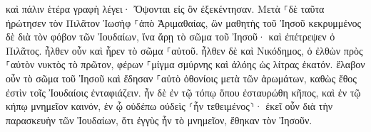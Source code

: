 \documentclass{openreader}
\begin{document}
καὶ πάλιν ἑτέρα γραφὴ λέγει· Ὄψονται εἰς ὃν ἐξεκέντησαν. 
Μετὰ ⸀δὲ ταῦτα ἠρώτησεν τὸν Πιλᾶτον Ἰωσὴφ ⸀ἀπὸ Ἁριμαθαίας, ὢν μαθητὴς τοῦ Ἰησοῦ κεκρυμμένος δὲ διὰ τὸν φόβον τῶν Ἰουδαίων, ἵνα ἄρῃ τὸ σῶμα τοῦ Ἰησοῦ· καὶ ἐπέτρεψεν ὁ Πιλᾶτος. ἦλθεν οὖν καὶ ἦρεν τὸ σῶμα ⸀αὐτοῦ. 
ἦλθεν δὲ καὶ Νικόδημος, ὁ ἐλθὼν πρὸς ⸀αὐτὸν νυκτὸς τὸ πρῶτον, φέρων ⸀μίγμα σμύρνης καὶ ἀλόης ὡς λίτρας ἑκατόν. 
ἔλαβον οὖν τὸ σῶμα τοῦ Ἰησοῦ καὶ ἔδησαν ⸀αὐτὸ ὀθονίοις μετὰ τῶν ἀρωμάτων, καθὼς ἔθος ἐστὶν τοῖς Ἰουδαίοις ἐνταφιάζειν. 
ἦν δὲ ἐν τῷ τόπῳ ὅπου ἐσταυρώθη κῆπος, καὶ ἐν τῷ κήπῳ μνημεῖον καινόν, ἐν ᾧ οὐδέπω οὐδεὶς ⸂ἦν τεθειμένος⸃· 
ἐκεῖ οὖν διὰ τὴν παρασκευὴν τῶν Ἰουδαίων, ὅτι ἐγγὺς ἦν τὸ μνημεῖον, ἔθηκαν τὸν Ἰησοῦν. 
\end{document}
